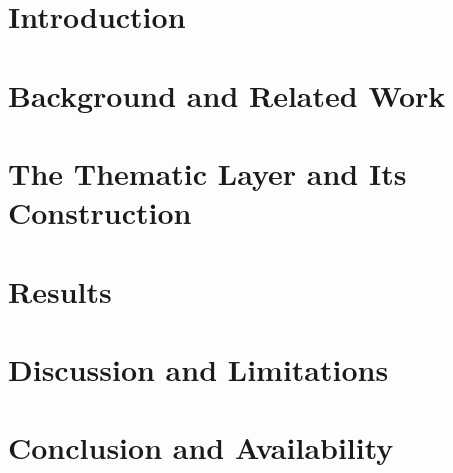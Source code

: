 \documentclass{IOS-Book-Article}     %
\newcommand{\todo}[1]{\textbf{[TODO: #1]}} %
\begin{document}

\section{Introduction}
\label{sec:introduction}


\section{Background and Related Work}
\label{sec:related-work}


\section{The Thematic Layer and Its Construction}
\label{sec:methodology}


\section{Results}
\label{sec:results}


\section{Discussion and Limitations}
\label{sec:discussion}


\section{Conclusion and Availability}
\label{sec:conclusion}


\label{end:body}




\end{document}
